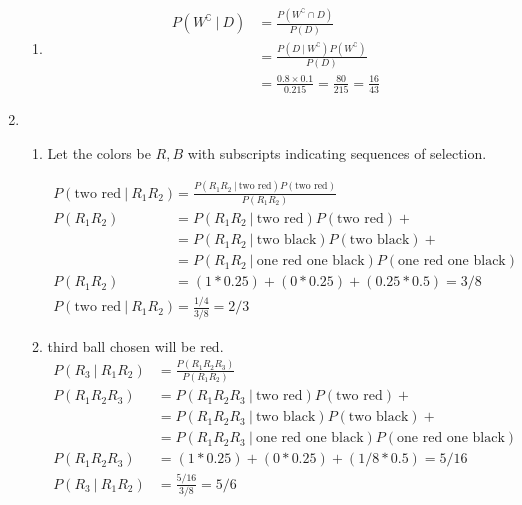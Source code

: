 \begin{enumerate}
\begin{enumerate}
		\item \begin{subequations}
			\begin{align}
				P(W^\complement\ |\ D) &= \frac{P(W^\complement \cap D)}{P(D)} \\
				&= \frac{P(D\ |\ W^\complement) P(W^\complement)}{P(D)} \\
				&= \frac{0.8 \times 0.1}{0.215} = \frac{80}{215} = \frac{16}{43}
			\end{align}
		\end{subequations}
		
	\end{enumerate}
	
	\item \begin{enumerate}
		\item Let the colors be $ R, B $ with subscripts indicating sequences of selection.
		
		\begin{subequations}
			\begin{align}
				P(\text{two red}\ |\ R_1 R_2) &= \frac{P(R_1 R_2\ |\ \text{two red}) P(\text{two red})}{P(R_1 R_2)} \\
				P(R_1 R_2) 	&= P(R_1 R_2\ |\ \text{two red}) P(\text{two red}) + \nonumber \\
				&= P(R_1 R_2\ |\ \text{two black}) P(\text{two black}) + \nonumber \\ 
				&= P(R_1 R_2\ |\ \text{one red one black}) P(\text{one red one black}) \\
				P(R_1 R_2) 	&= ( 1 * 0.25 ) + (0 * 0.25) + (0.25 * 0.5) = 3/8 \\
				P(\text{two red}\ |\ R_1 R_2) &= \frac{1/4}{3/8} = 2/3
			\end{align}
		\end{subequations}
		
		\item third ball chosen will be red.
		\begin{subequations}
			\begin{align}
				P(R_3\ |\ R_1 R_2) &= \frac{P(R_1 R_2 R_3)}{P(R_1 R_2)} \\
				P(R_1 R_2 R_3) 	&= P(R_1 R_2 R_3\ |\ \text{two red}) P(\text{two red}) + \nonumber \\
				&= P(R_1 R_2 R_3\ |\ \text{two black}) P(\text{two black}) + \nonumber \\ 
				&= P(R_1 R_2 R_3\ |\ \text{one red one black}) P(\text{one red one black}) \\
				P(R_1 R_2 R_3) 	&= ( 1 * 0.25 ) + (0 * 0.25) + (1/8 * 0.5) = 5/16 \\
				P(R_3\ |\ R_1 R_2) &= \frac{5/16}{3/8} = 5/6
			\end{align}
		\end{subequations}
	\end{enumerate}
	

\end{enumerate}
